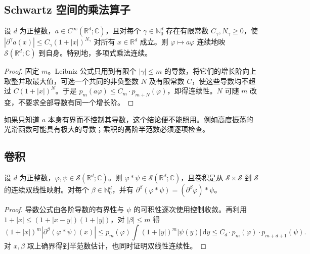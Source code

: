 \subsection{Schwartz 空间的乘法算子}
\label{b2:subsec:050104}

\begin{proposition}\label{b2:prop:05-multiplication}
设 \(d\) 为正整数，\(a\in C^\infty(\mathbb R^d;\mathbb C)\)，且对每个 \(\gamma\in\mathbb N_0^d\) 存在有限常数 \(C_\gamma,N_\gamma\geq0\)，使 \(|\partial^\gamma a(x)|\leq C_\gamma(1+|x|)^{N_\gamma}\) 对所有 \(x\in\mathbb R^d\) 成立。则 \(\varphi\mapsto a\varphi\) 连续地映 \(\mathcal S(\mathbb R^d;\mathbb C)\) 到自身。特别地，多项式乘法连续。
\end{proposition}
\begin{proof}
固定 \(m\)。Leibniz 公式只用到有限个 \(|\gamma|\leq m\) 的导数，将它们的增长阶向上取整并取最大值，可选一个共同的非负整数 \(N\) 及有限常数 \(C\)，使这些导数均不超过 \(C(1+|x|)^N\)。于是 \(p_m(a\varphi)\leq C_m\cdot p_{m+N}(\varphi)\)，即得连续性。\(N\) 可随 \(m\) 改变，不要求全部导数有同一个增长阶。
\end{proof}

如果只知道 \(a\) 本身有界而不控制其导数，这个结论便不能照用。例如高度振荡的光滑函数可能具有极大的导数；乘积的高阶半范数必须逐项检查。

\subsection{卷积}
\label{b2:subsec:050105}

\begin{proposition}\label{b2:prop:05-schwartz-convolution}
设 \(d\) 为正整数，\(\varphi,\psi\in\mathcal S(\mathbb R^d;\mathbb C)\)。则 \(\varphi*\psi\in\mathcal S(\mathbb R^d;\mathbb C)\)，且卷积是从 \(\mathcal S\times\mathcal S\) 到 \(\mathcal S\) 的连续双线性映射。对每个 \(\beta\in\mathbb N_0^d\)，并有 \(\partial^\beta(\varphi*\psi)=(\partial^\beta\varphi)*\psi\)。
\end{proposition}
\begin{proof}
导数公式由各阶导数的有界性与 \(\psi\) 的可积性逐次使用控制收敛。再利用 \(1+|x|\leq(1+|x-y|)(1+|y|)\)，对 \(|\beta|\leq m\) 得
\[
 (1+|x|)^m|\partial^\beta(\varphi*\psi)(x)|
 \leq p_m(\varphi)\int(1+|y|)^m|\psi(y)|\,\mathrm{d}y
 \leq C_d\cdot p_m(\varphi)\cdot p_{m+d+1}(\psi).
\]
对 \(x,\beta\) 取上确界得到半范数估计，也同时证明双线性连续性。
\end{proof}

